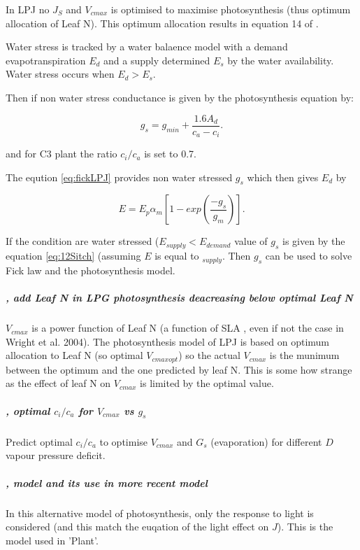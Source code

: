 \documentclass[a4paper,11pt]{article}
\begin{document}
In LPJ no $J_S$ and $V_{cmax}$ is optimised to maximise photosynthesis (thus optimum allocation of Leaf N). This optimum allocation results in equation 14 of \citet{Sitch-2008}.

Water stress is tracked by a water balaence model with a demand evapotranspiration $E_d$ and a supply determined $E_s$ by the water availability. Water stress occurs when $E_d > E_s$.

Then if non water stress conductance is given by the photosynthesis equation by:

\begin{equation}
\label{eq:fickLPJ}
g_s=g_{min} + \frac{1.6A_d}{c_a - c_i}.
\end{equation}

and for C3 plant the ratio $c_i / c_a$ is set to 0.7.

The eqution \ref{eq:fickLPJ} provides non water stressed $g_s$ which then gives $E_{d}$ by

\begin{equation}
\label{eq:12Sitch}
E=E_p \alpha_m [1 - exp(\frac{- g_s}{g_m})].
\end{equation}

If the condition are water stressed ($E_{supply} < E_{demand}$ value
of $g_s$ is given by the equation \ref{eq:12Sitch} (assuming $E$ is
equal to $_{supply}$. Then $g_s$ can be used to solve Fick law and the
photosynthesis model.

\subparagraph{\citet{Sakschewski-2015}, add Leaf N in LPG photosynthesis deacreasing below optimal Leaf N}

$V_{cmax}$ is a power function of Leaf N (a function of SLA , even if
not the case in Wright et al. 2004). The photosynthesis model of LPJ
is based on optimum allocation to Leaf N (so optimal $V_{cmax opt}$) so
the actual $V_{cmax}$ is the munimum between the optimum and the one
predicted by leaf N. This is some how strange as the effect of leaf N
on $V_{cmax}$ is limited by the optimal value.

\subparagraph{\citet{Prentice-2014}, optimal $c_i/c_a$ for $V_{cmax}$ vs $g_s$}

Predict optimal $c_i/c_a$ to optimise $V_{cmax}$ and $G_s$ (evaporation) for different $D$ vapour pressure deficit.

\subparagraph{\citet{Johnson-1984}, model and its use in more recent model}

In this alternative model of photosynthesis, only the response to
light is considered (and this match the euqation of the light effect
on $J$). This is the model used in 'Plant'.
\end{document}
